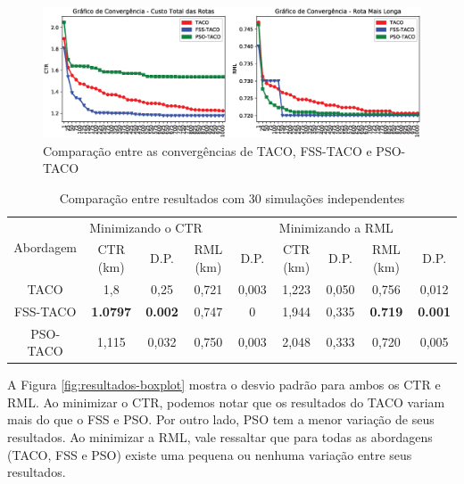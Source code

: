 \begin{figure}[htb]
    \centering
    \caption{Comparação entre as convergências de TACO, FSS-TACO e PSO-TACO} \label{fig:resultados-convergencia}
    \includegraphics[width=\textwidth]{imagens/convergence-approaches.eps}
\end{figure}

\begin{table}[htb]
    \centering
    \caption{Comparação entre resultados com 30 simulações independentes} \label{tab:resultado-comparison}
\begin{tabular}{|c|c|c|c|c|c|c|c|c|}
\hline
\multirow{2}{*}{Abordagem} & \multicolumn{4}{l|}{Minimizando o CTR}           & \multicolumn{4}{l|}{Minimizando a RML}          \\ \cline{2-9} 
                            & CTR (km)             & D.P.           & RML (km)   & D.P.  & CTR (km)   & D.P.  & RML (km)            & D.P.           \\ \hline
TACO                       & 1,8             & 0,25           & 0,721 & 0,003 & 1,223 & 0,050 & 0,756          & 0,012          \\ \hline
FSS-TACO                   & \textbf{1.0797} & \textbf{0.002} & 0,747 & 0     & 1,944 & 0,335 & \textbf{0.719} & \textbf{0.001} \\ \hline
PSO-TACO                   & 1,115           & 0,032          & 0,750 & 0,003 & 2,048 & 0,333 & 0,720          & 0,005          \\ \hline
\end{tabular}
\end{table}

A Figura \ref{fig:resultados-boxplot} mostra o desvio padrão para ambos os CTR e RML. Ao minimizar o CTR, podemos notar que os resultados do TACO variam mais do que o FSS e PSO. Por outro lado, PSO tem a menor variação de seus resultados. Ao minimizar a RML, vale ressaltar que para todas as abordagens (TACO, FSS e PSO) existe uma pequena ou nenhuma variação entre seus resultados.

